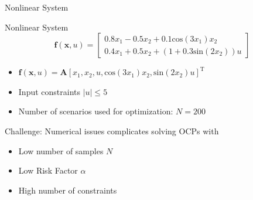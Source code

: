 \documentclass[student, noshadow, itr, english, aspectratio=169]{ITR_LSR_slides}
\begin{document}
\begin{frame}{Nonlinear System}

\begin{block}{Nonlinear System}
	\begin{equation*}
	\boldsymbol{f}(\boldsymbol{x}, u) = 
	\begin{bmatrix}
	0.8  x_1 - 0.5 x_2 + 0.1 \text{cos}(3 x_1) x_2\\
	0.4 x_1 + 0.5 x_2 + (1 + 0.3 \text{sin} (2 x_2 )) u
	\end{bmatrix}
	\end{equation*}
	\end{block}
	
	\begin{itemize}
	\item {} $\boldsymbol{f}(\boldsymbol{x}, u) = \boldsymbol{A} \left[x_1, x_2, u, \text{cos} ( 3 x_1) x_2, \text{sin} (2 x_2) u 				\right]^\text{T}$
	\item Input constraints $\left| u \right| \leq 5$
	\item Number of scenarios used for optimization: $N = 200$
	\end{itemize}


\vspace{.5cm}

	Challenge: Numerical issues complicates solving OCPs with

	\begin{itemize}
	\item Low number of samples $N$
	\item Low Risk Factor $\alpha$
	\item High number of constraints
	\end{itemize}


\end{frame}
\end{document}
